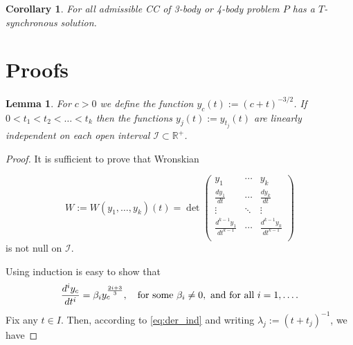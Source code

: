 \documentclass[twoside]{article}
\newtheorem{cor}[thm]{Corollary}
\newtheorem{lem}[thm]{Lemma}
\theoremstyle{remark}
\begin{document}
\begin{cor}
For all  admissible CC of 3-body or 4-body  problem $P$ has a $T$-synchronous solution.
\end{cor}




\section{Proofs}



\begin{lem}\label{lem:1} For $c>0$ we define the function $y_c(t):=(c+t)^{-3/2}$. If $0<t_1<t_2<\ldots<t_k$ then the functions $y_j(t):=y_{t_j}(t)$  are linearly independent on  each open interval   $\mathcal{I}\subset \mathbb{R}^+$.
\end{lem}
\begin{proof} It is sufficient to prove that Wronskian

 \[W:=W(y_1,\ldots,y_k)(t)=\det\begin{pmatrix}
			      y_1 & \cdots & y_k\\
			      \frac{dy_1}{dt}&  \cdots & \frac{dy_k}{dt}\\
			      \vdots & \ddots & \vdots \\
			      \frac{d^{k-1}y_1}{dt^{k-1}}&  \cdots & \frac{d^{k-1}y_k}{dt^{k-1}}\\
                           \end{pmatrix}
\]
is not null on $\mathcal{I}$.

Using induction is easy to show that
\begin{equation}\label{eq:der_ind}\frac{d^iy_c}{dt^i}=\beta_{i}y_{c}^{\frac{2i+3}{3}},\quad\hbox{for some }\beta_{i}\neq 0, \hbox{ and for all }i=1,\ldots.
\end{equation}
Fix any $t\in I$. Then, according to \eqref{eq:der_ind} and writing $\lambda_j:=(t+t_j)^{-1}$, we have


\end{proof}
\end{document}
